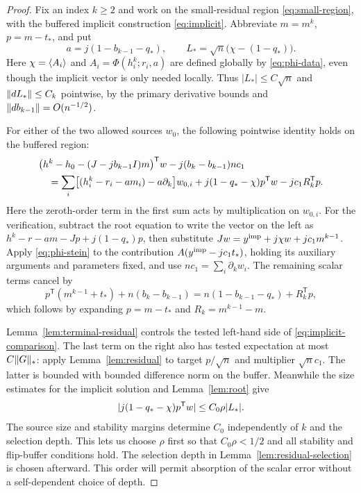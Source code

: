 \begin{proof}
Fix an index $k\ge2$ and work on the small-residual region
\eqref{eq:small-region}, with the buffered implicit construction
\eqref{eq:implicit}. Abbreviate $m=m^k$, $p=m-t_*$, and put
\[
 a=j(1-b_{k-1}-q_*),\qquad
 L_* =\sqrt n\bigl(\chi-(1-q_*)\bigr).
\]
Here $\chi=\langle A_i\rangle$ and $A_i=\Phi(h_i^k;r_i,a)$ are defined globally by
\eqref{eq:phi-data}, even though the implicit vector is only needed locally.
Thus $|L_*|\le C\sqrt n$ and $\lVert dL_*\rVert\le C_k$ pointwise, by the primary
derivative bounds and $\lVert db_{k-1}\rVert=O(n^{-1/2})$.

For either of the two allowed sources $w_0$, the following pointwise identity
holds on the buffered region:
\begin{align}\label{eq:implicit-comparison}
 &\bigl(h^k-h_0-(J-jb_{k-1}I)m\bigr)^{\mathsf T}w
       -j(b_k-b_{k-1})nc_1 \notag\\
 &\quad=\sum_i\bigl[(h_i^k-r_i-am_i)-a\partial_k\bigr]w_{0,i}
       +j(1-q_*-\chi)p^{\mathsf T}w-jc_1R_k^{\mathsf T}p.
\end{align}
Here the zeroth-order term in the first sum acts by multiplication on
$w_{0,i}$. For the verification, subtract the root equation to write the
vector on the left as $h^k-r-am-Jp+j(1-q_*)p$, then substitute
$Jw=y^{\rm imp}+j\chi w+jc_1m^{k-1}$. Apply \eqref{eq:phi-stein} to
the contribution $A(y^{\rm imp}-jc_1t_*)$, holding its auxiliary arguments
and parameters fixed, and use $nc_1=\sum_i\partial_k w_i$. The remaining
scalar terms cancel by
\[
 p^{\mathsf T}(m^{k-1}+t_*)+n(b_k-b_{k-1})
 =n(1-b_{k-1}-q_*)+R_k^{\mathsf T}p,
\]
which follows by expanding $p=m-t_*$ and $R_k=m^{k-1}-m$.

Lemma~\ref{lem:terminal-residual} controls the tested left-hand side of
\eqref{eq:implicit-comparison}. The last term on the right also has tested
expectation at most $C\lVert G\rVert_*$: apply Lemma~\ref{lem:residual} to target
$p/\sqrt n$ and multiplier $\sqrt n c_1$. The latter is bounded with bounded
difference norm on the buffer. Meanwhile the size estimates for the implicit
solution and Lemma~\ref{lem:root} give
\begin{equation}\label{eq:middle-error}
 \lvert j(1-q_*-\chi)p^{\mathsf T}w\rvert\le C_0\rho|L_*|.
\end{equation}
The source size and stability margins determine $C_0$ independently of
$k$ and the selection depth. This lets us choose $\rho$ first so that
$C_0\rho<1/2$ and all stability and flip-buffer conditions hold. The
selection depth in Lemma~\ref{lem:residual-selection} is chosen afterward.
This order will permit absorption of the scalar error without a
self-dependent choice of depth.


\end{proof}

